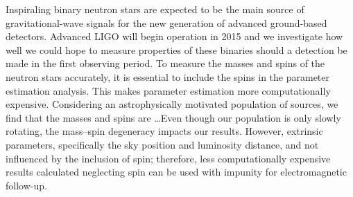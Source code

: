 Inspiraling binary neutron stars are expected to be the main source of gravitational-wave signals for the new generation of advanced ground-based detectors. Advanced LIGO will begin operation in 2015 and we investigate how well we could hope to measure properties of these binaries should a detection be made in the first observing period. To measure the masses and spins of the neutron stars accurately, it is essential to include the spins in the parameter estimation analysis. This makes parameter estimation more computationally expensive. Considering an astrophysically motivated population of sources, we find that the masses and spins are \ldots Even though our population is only slowly rotating, the mass--spin degeneracy impacts our results. However, extrinsic parameters, specifically the sky position and luminosity distance, and not influenced by the inclusion of spin; therefore, less computationally expensive results calculated neglecting spin can be used with impunity for electromagnetic follow-up.